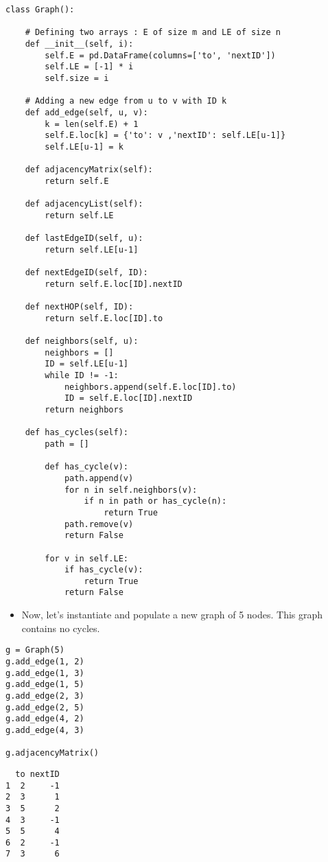 \documentclass[11pt]{article}
\begin{document}
\begin{verbatim}
class Graph():
    
    # Defining two arrays : E of size m and LE of size n
    def __init__(self, i):
        self.E = pd.DataFrame(columns=['to', 'nextID'])
        self.LE = [-1] * i
        self.size = i

    # Adding a new edge from u to v with ID k
    def add_edge(self, u, v):
        k = len(self.E) + 1
        self.E.loc[k] = {'to': v ,'nextID': self.LE[u-1]}
        self.LE[u-1] = k
        
    def adjacencyMatrix(self):
        return self.E
    
    def adjacencyList(self):
        return self.LE

    def lastEdgeID(self, u):
        return self.LE[u-1]

    def nextEdgeID(self, ID):
        return self.E.loc[ID].nextID
    
    def nextHOP(self, ID):
        return self.E.loc[ID].to

    def neighbors(self, u):
        neighbors = []
        ID = self.LE[u-1]
        while ID != -1:
            neighbors.append(self.E.loc[ID].to)
            ID = self.E.loc[ID].nextID
        return neighbors

    def has_cycles(self):
        path = []
        
        def has_cycle(v):
            path.append(v)
            for n in self.neighbors(v):
                if n in path or has_cycle(n):
                    return True
            path.remove(v)
            return False
        
        for v in self.LE:
            if has_cycle(v):
                return True
            return False
\end{verbatim}

\begin{itemize}
\item Now, let's instantiate and populate a new graph of 5 nodes. This graph
contains no cycles.
\end{itemize}

\begin{verbatim}
g = Graph(5)
g.add_edge(1, 2)
g.add_edge(1, 3)
g.add_edge(1, 5)
g.add_edge(2, 3)
g.add_edge(2, 5)
g.add_edge(4, 2)
g.add_edge(4, 3)

g.adjacencyMatrix()
\end{verbatim}

\begin{verbatim}
  to nextID
1  2     -1
2  3      1
3  5      2
4  3     -1
5  5      4
6  2     -1
7  3      6
\end{verbatim}
\end{document}
